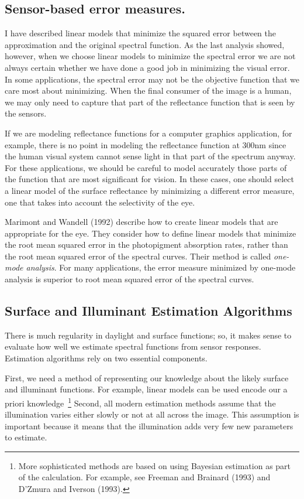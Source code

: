 \subsection*{Sensor-based error measures. }
I have described linear models that minimize the squared error between
the approximation and the original spectral function.  As the last
analysis showed, however, when we choose linear models to minimize the
spectral error we are not always certain whether we have done a good
job in minimizing the visual error.  In some applications, the
spectral error may not be the objective function that we care most
about minimizing.  When the final consumer of the image is a human, we
may only need to capture that part of the reflectance function that is
seen by the sensors.

If we are modeling reflectance functions for a computer graphics
application, for example, there is no point in modeling the
reflectance function at 300nm since the human visual system cannot
sense light in that part of the spectrum anyway.  For these
applications, we should be careful to model accurately those parts of
the function that are most significant for vision.  In these cases,
one should select a linear model of the surface reflectance by
minimizing a different error measure, one that takes into account the
selectivity of the eye.

Marimont and Wandell (1992) describe how to create linear models that
are appropriate for the eye.  They consider how to define linear
models that minimize the root mean squared error in the photopigment
absorption rates, rather than the root mean squared error of the
spectral curves.  Their method is called {\em one-mode analysis}.  For
many applications, the error measure minimized by one-mode analysis is
superior to root mean squared error of the spectral curves.

\subsection*{Surface and Illuminant Estimation Algorithms}
There is much regularity in daylight and surface functions; so, it
makes sense to evaluate how well we estimate spectral functions from
sensor responses.  Estimation algorithms rely on two essential
components.

First, we need a method of representing our knowledge about the likely
surface and illuminant functions.  For example, linear models can be
used encode our a priori knowledge~\footnote{More sophisticated
methods are based on using Bayesian estimation as part of the
calculation.  For example, see Freeman and Brainard (1993) and D'Zmura
and Iverson (1993).}  Second, all modern estimation methods assume
that the illumination varies either slowly or not at all across the
image.  This assumption is important because it means that the
illumination adds very few new parameters to estimate.

